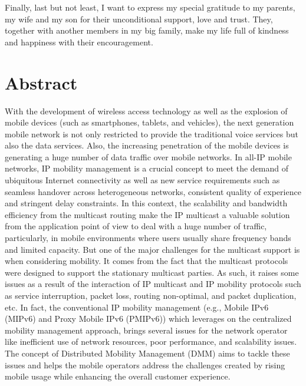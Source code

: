 \documentclass[a4paper,10pt,twoside]{ThesisStyle}
\begin{document}
Finally, last but not least, I want to express my special gratitude to my parents, my wife and my son for their unconditional support, love and trust. They, together with another members in my big family, make my life full of kindness and happiness with their encouragement.\\

\chapter*{Abstract}
With the development of wireless access technology as well as the explosion of mobile devices (such as smartphones, tablets, and vehicles), the next generation mobile network is not only restricted to provide the traditional voice services but also the data services. Also, the increasing penetration of the mobile devices is generating a huge number of data traffic over mobile networks. In all-IP mobile networks, IP mobility management is a crucial concept to meet the demand of ubiquitous Internet connectivity as well as new service requirements such as seamless handover across heterogeneous networks, consistent quality of experience and stringent delay constraints. In this context, the scalability and bandwidth efficiency from the multicast routing make the IP multicast a valuable solution from the application point of view to deal with a huge number of traffic, particularly, in mobile environments where users usually share frequency bands and limited capacity. But one of the major challenges for the multicast support is when considering mobility. It comes from the fact that the multicast protocols were designed to support the stationary multicast parties. As such, it raises some issues as a result of the interaction of IP multicast and IP mobility protocols such as service interruption, packet loss, routing non-optimal, and packet duplication, etc. In fact, the conventional IP mobility management (e.g., Mobile IPv6 (MIPv6) and Proxy Mobile IPv6 (PMIPv6)) which leverages on the centralized mobility management approach, brings several issues for the network operator like inefficient use of network resources, poor performance, and scalability issues. The concept of Distributed Mobility Management (DMM) aims to tackle these issues and helps the mobile operators address the challenges created by rising mobile usage while enhancing the overall customer experience.\\
\end{document}
